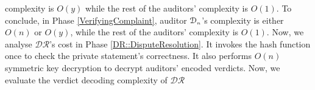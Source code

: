 complexity is $O(y)$ while the rest of the auditors' complexity is $O(1)$. To conclude, in Phase \ref{VerifyingComplaint},  auditor $\mathcal{D}_{\scriptscriptstyle n}$'s complexity is either $O(n)$ or $O(y)$, while the rest of  the auditors' complexity is $O(1)$. Now, we analyse $\mathcal{DR}$'s cost in Phase \ref{DR::DisputeResolution}. It invokes the hash function once to check the private statement's correctness. It also performs $O(n)$ symmetric key decryption to decrypt auditors' encoded verdicts. Now, we evaluate the verdict decoding complexity of $\mathcal{DR}$ 
%
%
%


